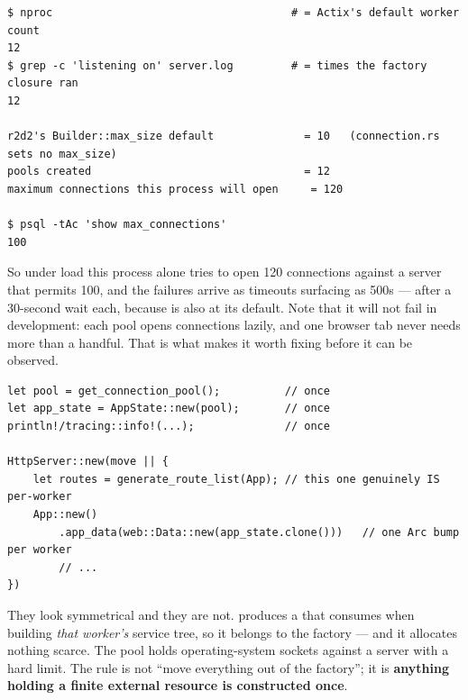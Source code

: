 \begin{verified}
\begin{lstlisting}[style=out]
$ nproc                                     # = Actix's default worker count
12
$ grep -c 'listening on' server.log         # = times the factory closure ran
12

r2d2's Builder::max_size default              = 10   (connection.rs sets no max_size)
pools created                                 = 12
maximum connections this process will open     = 120

$ psql -tAc 'show max_connections'
100
\end{lstlisting}
\end{verified}

So under load this process alone tries to open 120 connections against a server that permits 100,
and the failures arrive as  timeouts surfacing as 500s --- after a 30-second wait each,
because  is also at its default. Note that it will not fail in
development: each pool opens connections lazily, and one browser tab never needs more than a handful.
That is what makes it worth fixing before it can be observed.

\begin{pattern}
\begin{lstlisting}[style=rs]
let pool = get_connection_pool();          // once
let app_state = AppState::new(pool);       // once
println!/tracing::info!(...);              // once

HttpServer::new(move || {
    let routes = generate_route_list(App); // this one genuinely IS per-worker
    App::new()
        .app_data(web::Data::new(app_state.clone()))   // one Arc bump per worker
        // ...
})
\end{lstlisting}
\end{pattern}

\begin{why}
They look symmetrical and they are not.  produces a
 that  consumes when building \emph{that worker's}
service tree, so it belongs to the factory --- and it allocates nothing scarce. The pool holds
operating-system sockets against a server with a hard limit. The rule is not ``move everything
out of the factory''; it is \textbf{anything holding a finite external resource is constructed
once}.
\end{why}

